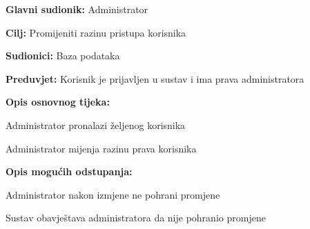 					\noindent {}
					\begin{packed_item}
						
						\item \textbf{Glavni sudionik: }Administrator
						\item  \textbf{Cilj:} Promijeniti razinu pristupa korisnika
						\item  \textbf{Sudionici:} Baza podataka
						\item  \textbf{Preduvjet:} Korisnik je prijavljen u sustav i ima prava administratora
						\item  \textbf{Opis osnovnog tijeka:}
						
						\item[] \begin{packed_enum}
							
							\item Administrator pronalazi željenog korisnika
							\item Administrator mijenja razinu prava korisnika
							
						\end{packed_enum}
						\item  \textbf{Opis mogućih odstupanja:}
						
						\item[] \begin{packed_item}
							
							\item[2.a] Administrator nakon izmjene ne pohrani promjene
							\item[] \begin{packed_enum}
								
								\item Sustav obavještava administratora da nije pohranio promjene
								
							\end{packed_enum}
						\end{packed_item}
					\end{packed_item}
					
					\eject
					
